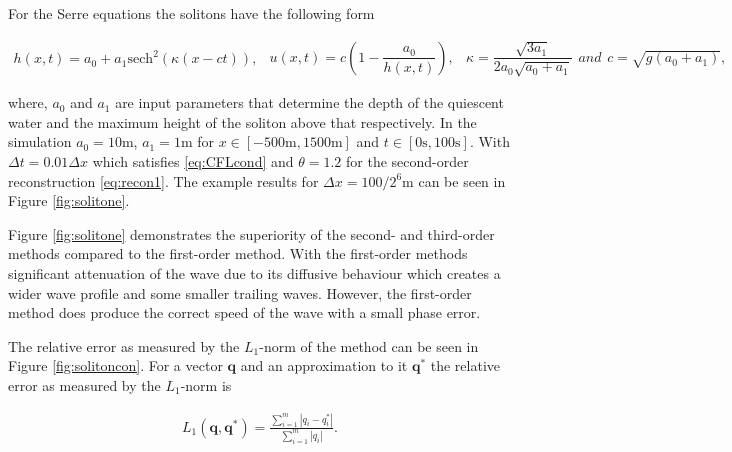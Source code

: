 \documentclass[SingleSpace,12pt]{Serre_ASCE}
\begin{document}
For the Serre equations the solitons have the following form
\begin{linenomath*}
\begin{subequations}
\begin{gather*}
h\left(x,t\right) = a_0 + a_1\text{sech}^2\left( \kappa\left(x - ct\right)\right),
\end{gather*}
\begin{gather*}
u\left(x,t\right) = c\left(1 - \dfrac{a_0}{h(x,t)} \right),
\end{gather*}
\begin{gather*}
\kappa = \dfrac{\sqrt{3a_1}}{2a_0 \sqrt{ a_0 + a_1}}
\end{gather*}
and
\begin{gather*}
c = \sqrt{g \left(a_0 + a_1\right)},
\end{gather*}
\end{subequations}
\label{eq:sol}
\end{linenomath*}
where, $a_0$ and $a_1$ are input parameters that determine the depth of the quiescent water and the maximum height of the soliton above that respectively. In the simulation $a_0 = 10\text{m}$, $a_1 = 1\text{m}$ for $x\in\left[-500\text{m},1500\text{m}\right]$ and $t\in\left[0\text{s},100\text{s}\right]$. With $\Delta t = 0.01 \Delta x$ which satisfies \eqref{eq:CFLcond} and $\theta = 1.2$ for the second-order reconstruction \eqref{eq:recon1}. The example results for $\Delta x = 100 /2^{6}\text{m}$ can be seen in Figure \ref{fig:solitone}. 

Figure \ref{fig:solitone} demonstrates the superiority of the second- and third-order methods compared to the first-order method. With the first-order methods significant attenuation of the wave due to its diffusive behaviour which creates a wider wave profile and some smaller trailing waves. However, the first-order method does produce the correct speed of the wave with a small phase error.

The relative error as measured by the $L_1$-norm of the method can be seen in Figure \ref{fig:solitoncon}. For a vector $\boldsymbol{q}$ and an approximation to it $\boldsymbol{q}^*$ the relative error as measured by the $L_1$-norm is
\begin{linenomath*}
\begin{gather}
L_1 \left(\boldsymbol{q},\boldsymbol{q}^*\right) = \frac{\sum_{i=1}^{m} |q_i - q^*_i|}{\sum_{i=1}^{m} |q_i|}.
\end{gather}
\end{linenomath*}
\end{document}
